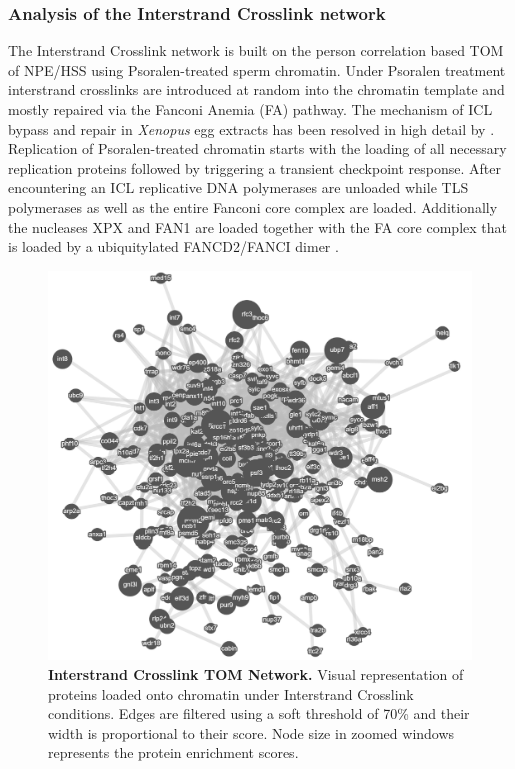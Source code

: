 \subsubsection{Analysis of the Interstrand Crosslink network}
\label{sec:iclnet}
The Interstrand Crosslink network is built on the person correlation based TOM of NPE/HSS using Psoralen-treated sperm chromatin. Under Psoralen treatment interstrand crosslinks are introduced at random into the chromatin template and mostly repaired via the Fanconi Anemia (FA) pathway. The mechanism of ICL bypass and repair in \textit{Xenopus} egg extracts has been resolved in high detail by \cite{Raschle.2015}. Replication of Psoralen-treated chromatin starts with the loading of all necessary replication proteins followed by triggering a transient checkpoint response. After encountering an ICL replicative DNA polymerases are unloaded while TLS polymerases as well as the entire Fanconi core complex are loaded. Additionally the nucleases XPX and FAN1 are loaded together with the FA core complex that is loaded by a ubiquitylated FANCD2/FANCI dimer \citep{Raschle.2015,Knipscheer.2009,Raschle.2008}.
\begin{figure}[H]
    \centering
    \includegraphics[width=\textwidth]{resources/images/Results/ICL_networkplot.PNG}
    \caption[Interstrand Crosslink TOM Network]{\textbf{Interstrand Crosslink TOM Network. }Visual representation of proteins loaded onto chromatin under Interstrand Crosslink conditions. Edges are filtered using a soft threshold of 70\% and their width  is proportional to their score. Node size in zoomed windows represents the protein enrichment scores.}
    \label{fig:ICLtom}
\end{figure}
